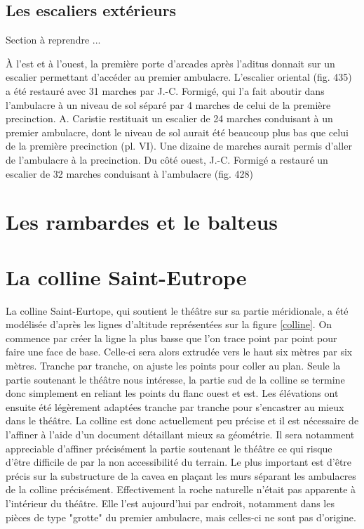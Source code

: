 \subsection{Les escaliers extérieurs}

Section à reprendre ...

\`{A} l'est et à l'ouest, la première porte d'arcades après l'\gls{aditus} donnait sur un escalier permettant d'accéder au premier \gls{ambulacre}. L'escalier oriental (fig. 435) a été restauré avec 31 marches par J.-C. Formigé, qui l'a fait aboutir dans l'\gls{ambulacre} à un niveau de sol séparé par 4 marches de celui de la première  \gls{precinction}. A. Caristie restituait un escalier de 24 marches conduisant à un premier \gls{ambulacre}, dont le niveau de sol aurait été beaucoup plus bas que celui de la première  \gls{precinction} (pl. VI). Une dizaine de
marches aurait permis d'aller de l'\gls{ambulacre} à la  \gls{precinction}.
Du côté ouest, J.-C. Formigé a restauré un escalier de 32 marches conduisant à
l'\gls{ambulacre} (fig. 428)

\section{Les rambardes et le \gls{balteus}} 

\section{La colline Saint-Eutrope} 
La colline Saint-Eurtope, qui soutient le théâtre sur sa partie méridionale, a été modélisée d'après les lignes d'altitude représentées sur la figure \ref{colline}. On commence par créer la ligne la plus basse que l'on trace point par point pour faire une face de base. Celle-ci sera alors extrudée vers le haut six mètres par six mètres. Tranche par tranche, on ajuste les points pour coller au plan. Seule la partie soutenant le théâtre nous intéresse, la partie sud de la colline se termine donc simplement en reliant les points du flanc ouest et est. Les élévations ont ensuite été légèrement adaptées tranche par tranche pour s'encastrer au mieux dans le théâtre. La colline est donc actuellement peu précise et il est nécessaire de l'affiner à l'aide d'un document détaillant mieux sa géométrie. Il sera notamment appreciable d'affiner précisément la partie soutenant le théâtre ce qui risque d'être difficile de par la non accessibilité du terrain. Le plus important est d'être précis sur la substructure de la  \gls{cavea} en plaçant les murs séparant les  \glspl{ambulacre} de la colline précisément. Effectivement la roche naturelle n'était pas apparente à l'intérieur du théâtre. Elle l'est aujourd'hui par endroit, notamment dans les pièces de type "grotte" du premier \gls{ambulacre}, mais celles-ci ne sont pas d'origine.

